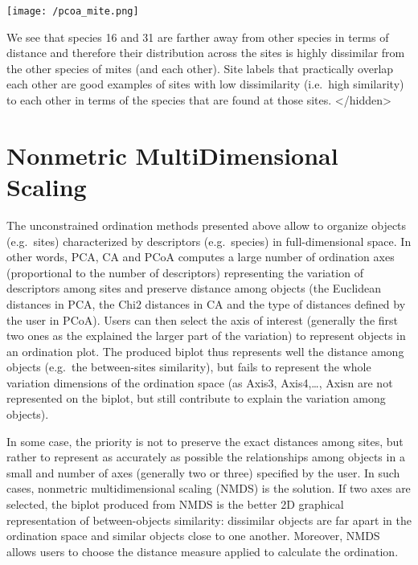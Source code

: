 \documentclass[
]{book}
\begin{document}
\texttt{[image: /pcoa\_mite.png]}

We see that species 16 and 31 are farther away from other species in
terms of distance and therefore their distribution across the sites is
highly dissimilar from the other species of mites (and each other). Site
labels that practically overlap each other are good examples of sites
with low dissimilarity (i.e.~high similarity) to each other in terms of
the species that are found at those sites. \textless/hidden\textgreater{}

\hypertarget{nonmetric-multidimensional-scaling}{%
\chapter{Nonmetric MultiDimensional Scaling}\label{nonmetric-multidimensional-scaling}}

The unconstrained ordination methods presented above allow to organize
objects (e.g.~sites) characterized by descriptors (e.g.~species) in
full-dimensional space. In other words, PCA, CA and PCoA computes a
large number of ordination axes (proportional to the number of
descriptors) representing the variation of descriptors among sites and
preserve distance among objects (the Euclidean distances in PCA, the
Chi2 distances in CA and the type of distances defined by the user in
PCoA). Users can then select the axis of interest (generally the first
two ones as the explained the larger part of the variation) to represent
objects in an ordination plot. The produced biplot thus represents well
the distance among objects (e.g.~the between-sites similarity), but
fails to represent the whole variation dimensions of the ordination
space (as Axis3, Axis4,\ldots, Axisn are not represented on the biplot, but
still contribute to explain the variation among objects).

In some case, the priority is not to preserve the exact distances among
sites, but rather to represent as accurately as possible the
relationships among objects in a small and number of axes (generally two
or three) specified by the user. In such cases, nonmetric
multidimensional scaling (NMDS) is the solution. If two axes are
selected, the biplot produced from NMDS is the better 2D graphical
representation of between-objects similarity: dissimilar objects are far
apart in the ordination space and similar objects close to one another.
Moreover, NMDS allows users to choose the distance measure applied to
calculate the ordination.
\end{document}

